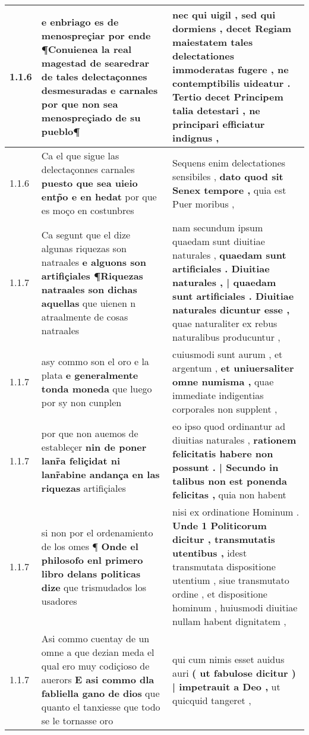 \begin{tabular}{|p{1cm}|p{6.5cm}|p{6.5cm}|}
1.1.6 & e enbriago es de menospreçiar \textbf{ por ende ¶Conuienea la real magestad de searedrar de tales delectaçonnes desmesuradas e carnales } por que non sea menospreçiado de su pueblo¶ & nec qui uigil , \textbf{ sed qui dormiens , decet Regiam maiestatem tales delectationes immoderatas fugere , } ne contemptibilis uideatur . Tertio decet Principem talia detestari , ne principari efficiatur indignus , \\\hline
1.1.6 & Ca el que sigue las delectaçonnes carnales \textbf{ puesto que sea uieio entp̃o e en hedat } por que es moço en costunbres & Sequens enim delectationes sensibiles , \textbf{ dato quod sit Senex tempore , } quia est Puer moribus , \\\hline
1.1.7 & Ca segunt que el dize algunas riquezas son natraales \textbf{ e alguons son artifiçiales ¶Riquezas natraales son dichas aquellas } que uienen n atraalmente de cosas natraales & nam secundum ipsum quaedam sunt diuitiae naturales , \textbf{ quaedam sunt artificiales . Diuitiae naturales , | quaedam sunt artificiales . Diuitiae naturales dicuntur esse , } quae naturaliter ex rebus naturalibus producuntur , \\\hline
1.1.7 & asy commo son el oro e la plata \textbf{ e generalmente tonda moneda } que luego por sy non cunplen & cuiusmodi sunt aurum , et argentum , \textbf{ et uniuersaliter omne numisma , } quae immediate indigentias corporales non supplent , \\\hline
1.1.7 & por que non auemos de estableçer \textbf{ nin de poner lanr̃a feliçidat ni lanr̃abine andança en las riquezas } artifiçiales & eo ipso quod ordinantur ad diuitias naturales , \textbf{ rationem felicitatis habere non possunt . | Secundo in talibus non est ponenda felicitas , } quia non habent \\\hline
1.1.7 & si non por el ordenamiento de los omes ¶ \textbf{ Onde el philosofo enl primero libro delans politicas dize } que trismudados los usadores & nisi ex ordinatione Hominum . \textbf{ Unde 1 Politicorum dicitur , transmutatis utentibus , } idest transmutata dispositione utentium , siue transmutato ordine , et dispositione hominum , huiusmodi diuitiae nullam habent dignitatem , \\\hline
1.1.7 & Asi commo cuentay de un omne a que dezian meda el qual ero muy codiçioso de auerors \textbf{ E asi commo dla fabliella gano de dios } que quanto el tanxiesse que todo se le tornasse oro & qui cum nimis esset auidus auri \textbf{ ( ut fabulose dicitur ) | impetrauit a Deo , } ut quicquid tangeret , \\\hline

\end{tabular}
